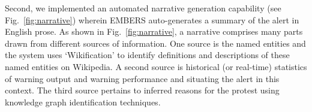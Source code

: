 
Second, we implemented an automated narrative generation capability
(see Fig.~\ref{fig:narrative}) wherein EMBERS auto-generates a summary
of the alert in English prose. As shown in Fig.~\ref{fig:narrative},
a narrative comprises many parts drawn from different sources
of information. One source is the named entities and the system uses
`Wikification' to identify definitions and descriptions of these
named entities on Wikipedia. A second source is historical (or real-time)
statistics of warning output and warning performance and situating the
alert in this context. The third source pertains to inferred reasons for
the protest using knowledge graph identification techniques.

